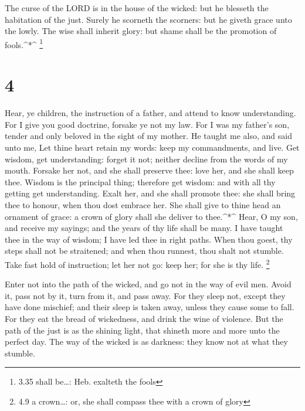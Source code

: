  The curse of the LORD is in the house of the wicked: but
he blesseth the habitation of the just.  Surely he scorneth
the scorners: but he giveth grace unto the lowly.  The wise
shall inherit glory: but shame shall be the promotion of fools.\^{}*\^{}
\footnote{3.35 shall be\ldots: Heb. exalteth the fools}

\hypertarget{section-3}{%
\section{4}\label{section-3}}

 Hear, ye children, the instruction of a father, and attend
to know understanding.  For I give you good doctrine,
forsake ye not my law.  For I was my father's son, tender
and only beloved in the sight of my mother.  He taught me
also, and said unto me, Let thine heart retain my words: keep my
commandments, and live.  Get wisdom, get understanding:
forget it not; neither decline from the words of my mouth. 
Forsake her not, and she shall preserve thee: love her, and she shall
keep thee.  Wisdom is the principal thing; therefore get
wisdom: and with all thy getting get understanding.  Exalt
her, and she shall promote thee: she shall bring thee to honour, when
thou dost embrace her.  She shall give to thine head an
ornament of grace: a crown of glory shall she deliver to thee.\^{}*\^{}
 Hear, O my son, and receive my sayings; and the years of
thy life shall be many.  I have taught thee in the way of
wisdom; I have led thee in right paths.  When thou goest,
thy steps shall not be straitened; and when thou runnest, thou shalt not
stumble.  Take fast hold of instruction; let her not go:
keep her; for she is thy life. \footnote{4.9 a crown\ldots: or, she
  shall compass thee with a crown of glory}

 Enter not into the path of the wicked, and go not in the
way of evil men.  Avoid it, pass not by it, turn from it,
and pass away.  For they sleep not, except they have done
mischief; and their sleep is taken away, unless they cause some to fall.
 For they eat the bread of wickedness, and drink the wine
of violence.  But the path of the just is as the shining
light, that shineth more and more unto the perfect day. 
The way of the wicked is as darkness: they know not at what they
stumble.


